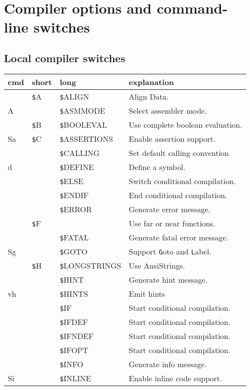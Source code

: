 \documentclass{article}
\newcommand{\var}[1]{{\texttt #1}}
\begin{document}
\section*{Compiler options and command-line switches}
\subsection*{Local compiler switches}
\begin{tabularx}{\textwidth}{lllX}
\textbf{cmd} & \textbf {short} & \textbf {long} & \textbf{explanation }\\ \hline
& \var{\$A} & \var{\$ALIGN} & Align Data.\\
A & & \var{\$ASMMODE} & Select assembler mode. \\
&\var{\$B} & \var{\$BOOLEVAL} & Use complete boolean evaluation. \\
Sa &\var{\$C} & \var{\$ASSERTIONS} & Enable assertion support. \\
& & \var{\$CALLING} & Set default calling convention \\
d && \var{\$DEFINE} & Define a symbol. \\
&& \var{\$ELSE} & Switch conditional compilation. \\
&& \var{\$ENDIF} & End conditional compilation. \\
&& \var{\$ERROR} & Generate error message. \\
&\var{\$F} & & Use far or near functions. \\
&&  \var{\$FATAL} & Generate fatal error message. \\
Sg && \var{\$GOTO} & Support \var{Goto} and \var{Label}. \\ 
&\var{\$H} & \var{\$LONGSTRINGS} & Use AnsiStrings. \\
 && \var{\$HINT} & Generate hint message. \\
vh && \var{\$HINTS} & Emit hints \\
&& \var{\$IF} & Start conditional compilation. \\
&& \var{\$IFDEF} & Start conditional compilation. \\
&& \var{\$IFNDEF} & Start conditional compilation. \\
&& \var{\$IFOPT} & Start conditional compilation. \\
&& \var{\$INFO} & Generate info message. \\
Si && \var{\$INLINE} & Enable inline code support. \\

\end{tabularx}
\end{document}

